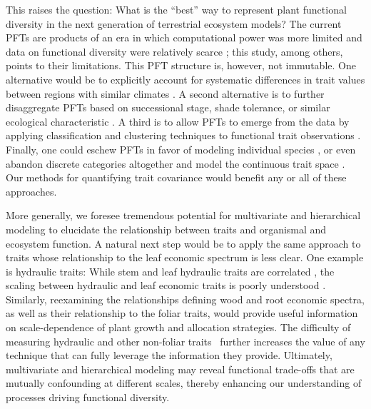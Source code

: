 \documentclass{article}
\begin{document}
This raises the question: What is the “best” way to represent plant functional diversity in the next generation of terrestrial ecosystem models?
The current PFTs are products of an era in which computational power was more limited and data on functional diversity were relatively scarce \citep{box_1995_factors,woodward_1996_pftintro,prentice_1992_special_paper}; this study, among others, points to their limitations.
This PFT structure is, however, not immutable.
One alternative would be to explicitly account for systematic differences in trait values between regions with similar climates \citep{butler_2017_mapping}.
A second alternative is to further disaggregate PFTs based on successional stage, shade tolerance, or similar ecological characteristic \citep{longo_2019_ed1,hickler_2011_projecting}.
A third is to allow PFTs to emerge from the data by applying classification and clustering techniques to functional trait observations \citep{boulangeat_2012_improving}.
Finally, one could eschew PFTs in favor of modeling individual species \citep{post_1996_linkages,weng_2015_scaling}, or even abandon discrete categories altogether and model the continuous trait space \citep{scheiter_2013_next}.
Our methods for quantifying trait covariance would benefit any or all of these approaches.

More generally, we foresee tremendous potential for multivariate and hierarchical modeling to elucidate the relationship between traits and organismal and ecosystem function.
A natural next step would be to apply the same approach to traits whose relationship to the leaf economic spectrum is less clear.
One example is hydraulic traits:
While stem and leaf hydraulic traits are correlated \citep{bartlett_2016_correlations}, the scaling between hydraulic and leaf economic traits is poorly understood \citep{reich_2014_world,li_2015_leaf}.
Similarly, reexamining the relationships defining wood \citep{chave_2009_towards,fortunel_2012_leaf,baraloto_2010_decoupled} and root \citep{kramer-walter_2016_root,valverde-barrantes_2016_root} economic spectra, as well as their relationship to the foliar traits, would provide useful information on scale-dependence of plant growth and allocation strategies.
The difficulty of measuring hydraulic and other non-foliar traits~\cite[e.g.][]{jansen_2015_current} further increases the value of any technique that can fully leverage the information they provide.
Ultimately, multivariate and hierarchical modeling may reveal functional trade-offs that are mutually confounding at different scales, thereby enhancing our understanding of processes driving functional diversity.
\end{document}
